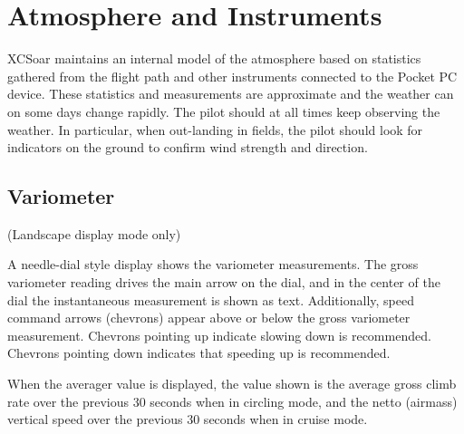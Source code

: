 \documentclass[a4paper,12pt]{refrep}
\begin{document}
\chapter{Atmosphere and Instruments}\label{cha:atmosph}
XCSoar maintains an internal model of the atmosphere based on
statistics gathered from the flight path and other instruments
connected to the Pocket PC device.  These statistics and measurements
are approximate and the weather can on some days change rapidly.  The
pilot should at all times keep observing the weather.  In
particular, when out-landing in fields, the pilot should look for
indicators on the ground to confirm wind strength and direction.

\section{Variometer}

(Landscape display mode only)

A needle-dial style display shows the variometer measurements.  The
gross variometer reading drives the main arrow on the dial, and in the
center of the dial the instantaneous measurement is shown as text.
Additionally, speed command arrows (chevrons) appear above or below
the gross variometer measurement.  Chevrons pointing up indicate
slowing down is recommended.  Chevrons pointing down indicates that
speeding up is recommended.  

When the averager value is displayed, the value shown is the average
gross climb rate over the previous 30 seconds when in circling mode,
and the netto (airmass) vertical speed over the previous 30 seconds
when in cruise mode.

\end{document}
